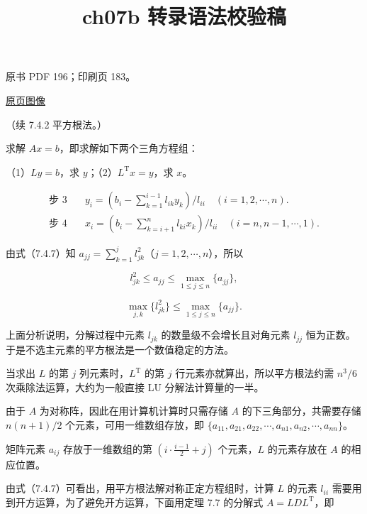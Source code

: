 \documentclass[
  10pt,
  fontset=fandol]{ctexart}
\title{ch07b 转录语法校验稿}
\author{}
\date{}
\begin{document}
\maketitle

\clearpage

原书 PDF 196；印刷页 183。

\href{../../../source-images/pdf-196.jpeg}{原页图像}

（续 7.4.2 平方根法。）

求解 \(Ax=b\)，即求解如下两个三角方程组：

（1）\(Ly=b\)，求 \(y\)；（2）\(L^{\mathrm T}x=y\)，求 \(x\)。

\[
\begin{aligned}
\text{步 3}\quad &y_i=\left(b_i-\sum_{k=1}^{i-1}l_{ik}y_k\right)/l_{ii}\quad(i=1,2,\cdots,n).\\
\text{步 4}\quad &x_i=\left(b_i-\sum_{k=i+1}^{n}l_{ki}x_k\right)/l_{ii}\quad(i=n,n-1,\cdots,1).
\end{aligned}
\tag{7.4.8}
\]

由式（7.4.7）知
\(a_{jj}=\sum_{k=1}^{j}l_{jk}^{2}\)（\(j=1,2,\cdots,n\)），所以

\[
l_{jk}^{2}\leqslant a_{jj}\leqslant\max_{1\leqslant j\leqslant n}\{a_{jj}\},
\]

\[
\max_{j,k}\{l_{jk}^{2}\}\leqslant\max_{1\leqslant j\leqslant n}\{a_{jj}\}.
\]

上面分析说明，分解过程中元素 \(l_{jk}\) 的数量级不会增长且对角元素
\(l_{jj}\) 恒为正数。于是不选主元素的平方根法是一个数值稳定的方法。

当求出 \(L\) 的第 \(j\) 列元素时，\(L^{\mathrm T}\) 的第 \(j\)
行元素亦就算出，所以平方根法约需 \(n^3/6\) 次乘除法运算，大约为一般直接
LU 分解法计算量的一半。

由于 \(A\) 为对称阵，因此在用计算机计算时只需存储 \(A\)
的下三角部分，共需要存储 \(n(n+1)/2\) 个元素，可用一维数组存放，即
\(\{a_{11},a_{21},a_{22},\cdots,a_{n1},a_{n2},\cdots,a_{nn}\}\)。

矩阵元素 \(a_{ij}\) 存放于一维数组的第
\(\left(i\cdot\frac{i-1}{2}+j\right)\) 个元素，\(L\) 的元素存放在 \(A\)
的相应位置。

由式（7.4.7）可看出，用平方根法解对称正定方程组时，计算 \(L\) 的元素
\(l_{ii}\) 需要用到开方运算，为了避免开方运算，下面用定理 7.7 的分解式
\(A=LDL^{\mathrm T}\)，即
\end{document}
